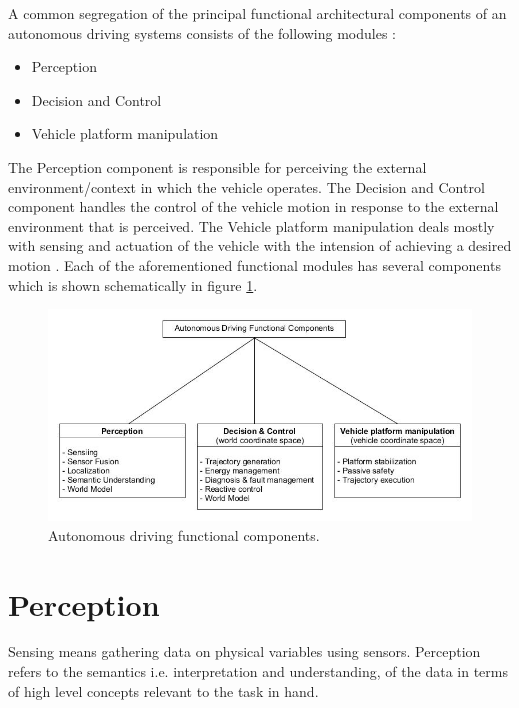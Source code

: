 A common segregation of the principal functional architectural components of an autonomous driving systems consists of the following modules \cite{Bahere}:

\begin{itemize}
\item Perception
\item Decision and Control
\item Vehicle platform manipulation
\end{itemize}


The Perception component is responsible for perceiving the external environment/context in which the vehicle operates.  
The Decision and Control component handles the control of the vehicle motion in response to the external environment that is perceived. 
The Vehicle platform manipulation deals mostly with sensing and actuation of the vehicle with the intension of achieving a desired motion \cite{Bahere}.
Each of the aforementioned functional modules has several components which is shown schematically in figure \ref{autonomous_driving_components}. 



\begin{figure}[!htb]
\begin{center}
\includegraphics[scale=0.380]{img/autonomous_driving_components.jpg}
\end{center}
\caption{Autonomous driving functional components.}
\label{autonomous_driving_components}
\end{figure}


\section{Perception}

Sensing means gathering data on physical variables using sensors. Perception refers to the semantics 
i.e. interpretation and understanding, of the data in terms of high level concepts relevant to the task in hand.

